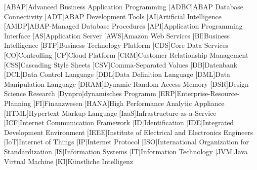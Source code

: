 
	
	\begin{acronym}[XXXXXXX]
		{Advanced Business Application Programming}
		{ABAP Database Connectivity}
		[ADT]{ABAP Development Tools}
		[AI]{Artificial Intelligence}
		{ABAP-Managed Database Procedures}
		[API]{Application Programming Interface}
		[AS]{Application Server}
		[AWS]{Amazon Web Services}
		[BI]{Business Intelligence}
		[BTP]{Business Technology Platform}
		[CDS]{Core Data Services}
		[CO]{Controlling}
		[CP]{Cloud Platform}
		[CRM]{Customer Relationship Management}
		[CSS]{Cascading Style Sheets}
		[CSV]{Comma-Separated Values}
		[DB]{Datenbank}
		[DCL]{Data Control Language}
		[DDL]{Data Definition Language}
		[DML]{Data Manipulation Language}
		{Dynamic Random Access Memory}
		[DSR]{Design Science Research}
		[Dynpro]{dynamisches Programm}
		[ERP]{Enterprise-Resource-Planning}
		[FI]{Finanzwesen}
		{High Performance Analytic Appliance}
		{Hypertext Markup Language}
		{Infrastructure-as-a-Service}
		[ICF]{Internet Communication Framework}
		[ID]{Identification}
		[IDE]{Integrated Development Environment}
		{Institute of Electrical and Electronics Engineers}
		[IoT]{Internet of Things}
		[IP]{Internet Protocol}
		[ISO]{International Organization for Standardization}
		[IS]{Information Systems}
		[IT]{Information Technology}
		[JVM]{Java Virtual Machine}
		[KI]{Künstliche Intelligenz}


\end{acronym}
